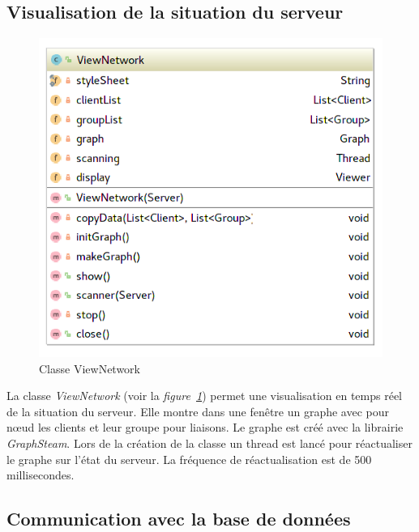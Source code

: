 \documentclass[a4paper,11pt]{report}
\begin{document}
\subsection{Visualisation de la situation du serveur}

    \begin{figure}[th]
      \begin{center}
        \includegraphics[scale=0.3]{Assets/UML_Network.png}
        \caption{Classe ViewNetwork}
        \label{Classe ViewNetwork}
      \end{center}
    \end{figure}
    
    La classe \textit{ViewNetwork} (voir la \textit{figure~\ref{Classe ViewNetwork}}) permet une visualisation en temps réel de la situation du serveur. Elle montre dans une fenêtre un graphe avec pour nœud les clients et leur groupe pour liaisons. Le graphe est créé avec la librairie \textit{GraphSteam}. Lors de la création de la classe un thread est lancé pour réactualiser le graphe sur l’état du serveur. La fréquence de réactualisation est de 500 millisecondes.

\subsection{Communication avec la base de données}
\end{document}
